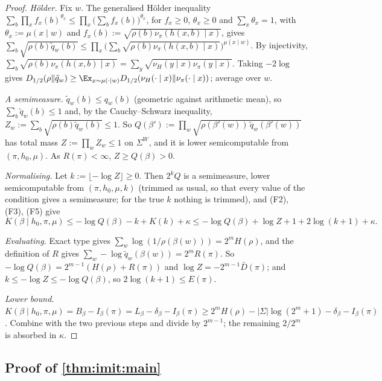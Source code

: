 \begin{proof}
\emph{Hölder.} Fix $w$. The generalised Hölder inequality $\sum_b\prod_xf_x(b)^{\theta_x}\le\prod_x\big(\sum_bf_x(b)\big)^{\theta_x}$, for $f_x\ge0$, $\theta_x\ge0$ and $\sum_x\theta_x=1$, with $\theta_x:=\mu(x\mid w)$ and $f_x(b):=\sqrt{\rho(b)\nu_\pi(h(x,b)\mid x)}$, gives $\sum_b\sqrt{\rho(b)\tilde q_w(b)}\le\prod_x\big(\sum_b\sqrt{\rho(b)\nu_\pi(h(x,b)\mid x)}\big)^{\mu(x\mid w)}$. By injectivity, $\sum_b\sqrt{\rho(b)\nu_\pi(h(x,b)\mid x)}=\sum_y\sqrt{\nu_H(y\mid x)\nu_\pi(y\mid x)}$. Taking $-2\log$ gives $D_{1/2}(\rho\Vert\tilde q_w)\ge\Ex_{x\sim\mu(\cdot\mid w)}D_{1/2}(\nu_H(\cdot\mid x)\Vert\nu_\pi(\cdot\mid x))$; average over $w$.

\emph{A semimeasure.} $\tilde q_w(b)\le q_w(b)$ (geometric against arithmetic mean), so $\sum_b\tilde q_w(b)\le1$ and, by the Cauchy--Schwarz inequality, $Z_w:=\sum_b\sqrt{\rho(b)\tilde q_w(b)}\le1$. So $Q(\beta'):=\prod_w\sqrt{\rho(\beta'(w))\,\tilde q_w(\beta'(w))}$ has total mass $Z:=\prod_wZ_w\le1$ on $\Sigma^W$, and it is lower semicomputable from $(\pi,h_0,\mu)$. As $R(\pi)<\infty$, $Z\ge Q(\beta)>0$.

\emph{Normalising.} Let $k:=\lfloor-\log Z\rfloor\ge0$. Then $2^kQ$ is a semimeasure, lower semicomputable from $(\pi,h_0,\mu,k)$ (trimmed as usual, so that every value of the condition gives a semimeasure; for the true $k$ nothing is trimmed), and (F2), (F3), (F5) give
\[
K(\beta\mid h_0,\pi,\mu)\le-\log Q(\beta)-k+K(k)+\kappa\le-\log Q(\beta)+\log Z+1+2\log(k+1)+\kappa .
\]

\emph{Evaluating.} Exact type gives $\sum_w\log(1/\rho(\beta(w)))=2^mH(\rho)$, and the definition of $R$ gives $\sum_w-\log\tilde q_w(\beta(w))=2^mR(\pi)$. So $-\log Q(\beta)=2^{m-1}(H(\rho)+R(\pi))$ and $\log Z=-2^{m-1}\bar D(\pi)$; and $k\le-\log Z\le-\log Q(\beta)$, so $2\log(k+1)\le E(\pi)$.

\emph{Lower bound.} $K(\beta\mid h_0,\pi,\mu)=B_\beta-I_\beta(\pi)=L_\beta-\delta_\beta-I_\beta(\pi)\ge2^mH(\rho)-|\Sigma|\log(2^m+1)-\delta_\beta-I_\beta(\pi)$. Combine with the two previous steps and divide by $2^{m-1}$; the remaining $2/2^m$ is absorbed in $\kappa$.
\end{proof}

\subsection{Proof of \texorpdfstring{\cref{thm:imit:main}}{the near-imitation theorem}}\label{app:imit:main}

